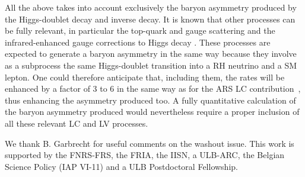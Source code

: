 \documentclass[prd,twocolumn,superscriptaddress,preprintnumbers,nofootinbib,
noshowpacs,groupedaddress]{revtex4-1} %
\begin{document}
All the above takes into account exclusively the baryon asymmetry produced by the Higgs-doublet decay and inverse decay.
It is known that other processes can be fully relevant, in particular the top-quark and gauge scattering and the infrared-enhanced gauge corrections to Higgs decay \cite{Besak:2012qm,Ghiglieri:2016xye,Ghiglieri:2017gjz}.
These processes are expected to generate a baryon asymmetry in the same way because they involve as a subprocess the same Higgs-doublet transition into a RH neutrino and a SM lepton. One could therefore anticipate that, including them, the rates will be enhanced by a factor of 3 to 6 in the same way as for the ARS LC contribution~\cite{Besak:2012qm}, thus enhancing the asymmetry produced too.  
A fully quantitative calculation of the baryon asymmetry  produced would nevertheless require a proper inclusion of all these relevant LC and LV processes. 



\bigskip

\acknowledgments
We thank B. Garbrecht for useful comments on the washout issue.
This work is supported by the FNRS-FRS, the FRIA, the IISN, a ULB-ARC, the Belgian Science Policy (IAP VI-11) and a ULB Postdoctoral Fellowship.
\end{document}
